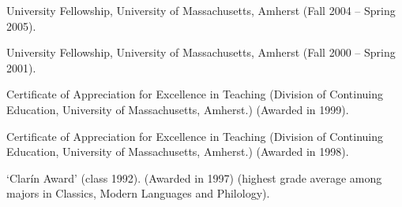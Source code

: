 \documentclass[11pt]{article}
\begin{document}
University Fellowship, University of Massachusetts, Amherst (Fall
 2004 -- Spring 2005).

University Fellowship, University of Massachusetts, Amherst (Fall 2000
-- Spring 2001).

Certificate of Appreciation for Excellence in Teaching (Division of
Continuing Education, University of Massachusetts, Amherst.) (Awarded
in 1999).

Certificate of Appreciation for Excellence in Teaching (Division of
Continuing Education, University of Massachusetts, Amherst.) (Awarded
in 1998).

`Clar\'in Award' (class 1992). (Awarded in 1997) (highest grade average among majors in Classics, Modern Languages and Philology).


\end{document}
